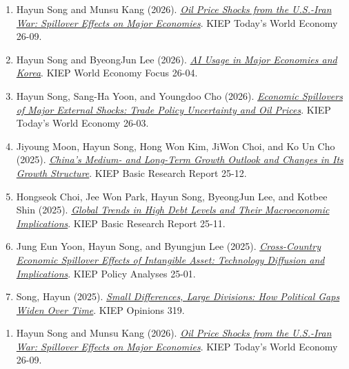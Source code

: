 \begin{enumerate}[itemsep=0.25em]
\iflongcv
\newpage
{}
\begin{enumerate}[series=kieppubs,itemsep=0.30em]
  \item Hayun Song and Munsu Kang (2026). \href{https://www.kiep.go.kr/gallery.es?act=view\&bid=0003\&list_no=12327\&mid=a10102020000}{\emph{Oil Price Shocks from the U.S.-Iran War: Spillover Effects on Major Economies}}. KIEP Today's World Economy 26-09.
  \item Hayun Song and ByeongJun Lee (2026). \href{https://www.kiep.go.kr/gallery.es?act=view\&bid=0004\&list_no=12214\&mid=a10102030000}{\emph{AI Usage in Major Economies and Korea}}. KIEP World Economy Focus 26-04.
  \item Hayun Song, Sang-Ha Yoon, and Youngdoo Cho (2026). \href{https://www.kiep.go.kr/gallery.es?act=view\&bid=0003\&list_no=12190\&mid=a10102020000}{\emph{Economic Spillovers of Major External Shocks: Trade Policy Uncertainty and Oil Prices}}. KIEP Today's World Economy 26-03.
  \item Jiyoung Moon, Hayun Song, Hong Won Kim, JiWon Choi, and Ko Un Cho (2025). \href{https://www.kiep.go.kr/gallery.es?act=view\&bid=0001\&list_no=12325\&mid=a10101200000}{\emph{China's Medium- and Long-Term Growth Outlook and Changes in Its Growth Structure}}. KIEP Basic Research Report 25-12.
  \item Hongseok Choi, Jee Won Park, Hayun Song, ByeongJun Lee, and Kotbee Shin (2025). \href{https://www.kiep.go.kr/gallery.es?act=view\&bid=0001\&list_no=12300\&mid=a10101200000}{\emph{Global Trends in High Debt Levels and Their Macroeconomic Implications}}. KIEP Basic Research Report 25-11.
  \item Jung Eun Yoon, Hayun Song, and Byungjun Lee (2025). \href{https://www.kiep.go.kr/gallery.es?act=view\&bid=0001\&list_no=12180\&mid=a20205040000}{\emph{Cross-Country Economic Spillover Effects of Intangible Asset: Technology Diffusion and Implications}}. KIEP Policy Analyses 25-01.
  \item Song, Hayun (2025). \href{https://www.kiep.go.kr/gallery.es?act=view\&bid=0008\&list_no=11935\&mid=a20205020000}{\emph{Small Differences, Large Divisions: How Political Gaps Widen Over Time}}. KIEP Opinions 319.
\end{enumerate}
\else
{}
\begin{enumerate}[itemsep=0.32em]
  \item Hayun Song and Munsu Kang (2026). \href{https://www.kiep.go.kr/gallery.es?act=view\&bid=0003\&list_no=12327\&mid=a10102020000}{\emph{Oil Price Shocks from the U.S.-Iran War: Spillover Effects on Major Economies}}. KIEP Today's World Economy 26-09.

\end{enumerate}
\end{enumerate}
